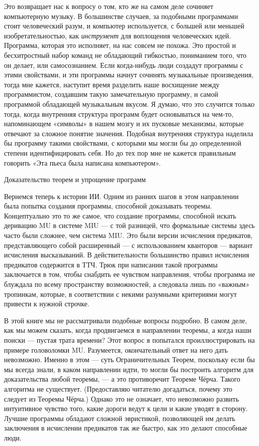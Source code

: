 \documentclass[../main.tex]{subfiles}
\begin{document}
Это возвращает нас к вопросу о том, кто же на самом деле сочиняет компьютерную музыку. В большинстве случаев, за подобными программами стоит человеческий разум, и компьютер используется, с большей или меньшей изобретательностью, как \emph{инструмент} для воплощения человеческих идей. Программа, которая это исполняет, на нас совсем не похожа. Это простой и бесхитростный набор команд не обладающий гибкостью, пониманием того, что он делает, или самосознанием. Если когда-нибудь люди создадут программы с этими свойствами, и эти программы начнут сочинять музыкальные произведения, тогда мне кажется, наступит время разделить наше восхищение между программистом, создавшим такую замечательную программу, и самой программой обладающей музыкальным вкусом. Я думаю, что это случится только тогда, когда внутренняя структура программ будет основываться на чем-то, напоминающем «символы» в нашем мозгу и их пусковые механизмы, которые отвечают за сложное понятие значения. Подобная внутренняя структура наделила бы программу такими свойствами, с которыми мы могли бы до определенной степени идентифицировать себя. Но до тех пор мне не кажется правильным говорить «Эта пьеса была написана компьютером».

Доказательство теорем и упрощение программ

Вернемся теперь к истории ИИ. Одним из ранних шагов в этом направлении была попытка создания программы, способной доказывать теоремы. Концептуально это то же самое, что создание программы, способной искать деривацию MU в системе MIU --- с той разницей, что формальные системы здесь часто были сложнее, чем система MIU. Это были версии исчисления предикатов, представляющего собой расширенный --- с использованием кванторов --- вариант исчисления высказываний. В действительности большинство правил исчисления предикатов содержится в ТТЧ. Трюк при написании такой программы заключается в том, чтобы снабдить ее чувством направления, чтобы программа не блуждала по всему пространству возможностей, а следовала лишь по «важным» тропинкам, которые, в соответствии с некими разумными критериями могут привести к нужной строчке.

В этой книге мы не рассматривали подобные вопросы подробно. В самом деле, как мы можем сказать, когда продвигаемся в направлении теоремы, а когда наши поиски --- пустая трата времени? Этот вопрос я попытался проиллюстрировать на примере головоломки MU. Разумеется, окончательный ответ на него дать невозможно. Именно в этом --- суть Ограничительных Теорем, поскольку если бы мы всегда знали, в каком направлении идти, то могли бы построить алгоритм для доказательства любой теоремы, --- а это противоречит Теореме Чёрча. Такого алгоритма не существует. (Предоставляю читателю догадаться, почему это следует из Теоремы Чёрча.) Однако это не означает, что невозможно развить интуитивное чувство того, какие дороги ведут к цели и какие уводят в сторону. Лучшие программы обладают сложной эвристикой, позволяющей им делать заключения в исчислении предикатов так же быстро, как это делают способные люди.
\end{document}
